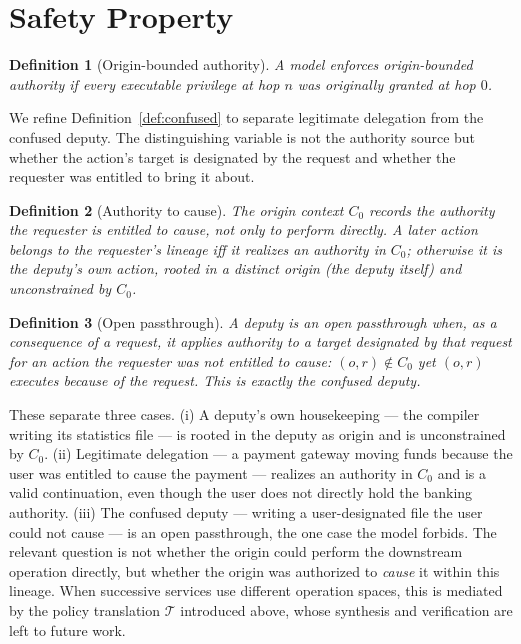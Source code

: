 \documentclass[11pt]{article}
\newtheorem{definition}{Definition}
\begin{document}
\section{Safety Property}
\label{sec:openpassthrough}

\begin{definition}[Origin-bounded authority]
A model enforces origin-bounded authority if every executable privilege at hop
$n$ was originally granted at hop $0$.
\end{definition}

We refine Definition~\ref{def:confused} to separate legitimate delegation from
the confused deputy. The distinguishing variable is not the authority source but whether the
action's target is designated by the request and whether the requester was
entitled to bring it about.

\begin{definition}[Authority to cause]
The origin context $C_0$ records the authority the requester is entitled to
\emph{cause}, not only to perform directly. A later action belongs to the
requester's lineage iff it realizes an authority in $C_0$; otherwise it is the
deputy's own action, rooted in a distinct origin (the deputy itself) and
unconstrained by $C_0$.
\end{definition}

\begin{definition}[Open passthrough]
A deputy is an \emph{open passthrough} when, as a consequence of a request, it
applies authority to a target designated by that request for an action the
requester was not entitled to cause: $(o,r) \notin C_0$ yet $(o,r)$ executes
because of the request. This is exactly the confused deputy.
\end{definition}

These separate three cases. (i) A deputy's own housekeeping --- the compiler
writing its statistics file --- is rooted in the deputy as origin and is
unconstrained by $C_0$. (ii) Legitimate delegation --- a payment gateway moving
funds because the user was entitled to cause the payment --- realizes an
authority in $C_0$ and is a valid continuation, even though the user does not
directly hold the banking authority. (iii) The confused deputy --- writing a
user-designated file the user could not cause --- is an open passthrough, the one
case the model forbids. The relevant question is not whether the origin could
perform the downstream operation directly, but whether the origin was authorized
to \emph{cause} it within this lineage. When successive services use different
operation spaces, this is mediated by the policy translation $\mathcal{T}$
introduced above, whose synthesis and verification are left to future work.
\end{document}
